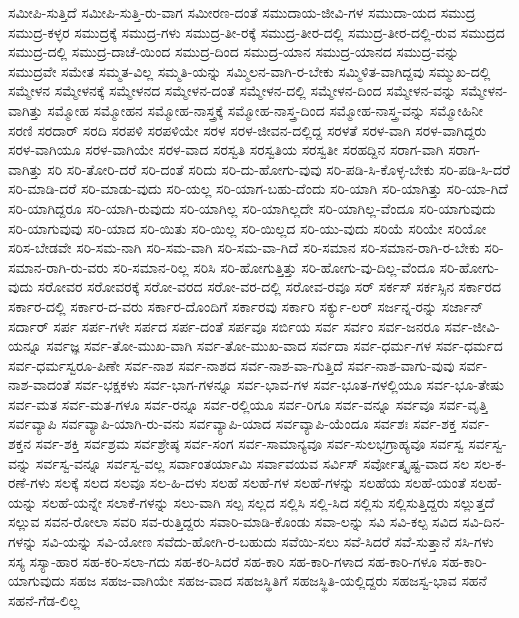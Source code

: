 {ಸಮೀಪಿ-ಸುತ್ತಿದೆ
ಸಮೀಪಿ-ಸುತ್ತಿ-ರು-ವಾಗ
ಸಮೀರಣ-ದಂತೆ
ಸಮುದಾಯ-ಜೀವಿ-ಗಳ
ಸಮುದಾ-ಯದ
ಸಮುದ್ರ
ಸಮುದ್ರ-ಕಳ್ಳರ
ಸಮುದ್ರಕ್ಕೆ
ಸಮುದ್ರ-ಗಳು
ಸಮುದ್ರ-ತೀ-ರಕ್ಕೆ
ಸಮುದ್ರ-ತೀರ-ದಲ್ಲಿ
ಸಮುದ್ರ-ತೀರ-ದಲ್ಲಿ-ರುವ
ಸಮುದ್ರದ
ಸಮುದ್ರ-ದಲ್ಲಿ
ಸಮುದ್ರ-ದಾಚೆ-ಯಿಂದ
ಸಮುದ್ರ-ದಿಂದ
ಸಮುದ್ರ-ಯಾನ
ಸಮುದ್ರ-ಯಾನದ
ಸಮುದ್ರ-ವನ್ನು
ಸಮುದ್ರವೇ
ಸಮೇತ
ಸಮ್ಮತ-ವಿಲ್ಲ
ಸಮ್ಮತಿ-ಯನ್ನು
ಸಮ್ಮಿಲನ-ವಾಗಿ-ರ-ಬೇಕು
ಸಮ್ಮಿಳಿತ-ವಾಗಿದ್ದವು
ಸಮ್ಮುಖ-ದಲ್ಲಿ
ಸಮ್ಮೇಳನ
ಸಮ್ಮೇಳನಕ್ಕೆ
ಸಮ್ಮೇಳನದ
ಸಮ್ಮೇಳನ-ದಂತೆ
ಸಮ್ಮೇಳನ-ದಲ್ಲಿ
ಸಮ್ಮೇಳನ-ದಿಂದ
ಸಮ್ಮೇಳನ-ವನ್ನು
ಸಮ್ಮೇಳನ-ವಾಗಿತ್ತು
ಸಮ್ಮೋಹ
ಸಮ್ಮೋಹನ
ಸಮ್ಮೋಹ-ನಾಸ್ತ್ರಕ್ಕೆ
ಸಮ್ಮೋಹ-ನಾಸ್ತ್ರ-ದಿಂದ
ಸಮ್ಮೋಹ-ನಾಸ್ತ್ರ-ವನ್ನು
ಸಮ್ಮೋಹಿನೀ
ಸರಣಿ
ಸರದಾರ್
ಸರದಿ
ಸರಪಳಿ
ಸರಪಳಿಯೇ
ಸರಳ
ಸರಳ-ಜೀವನ-ದಲ್ಲಿದ್ದ
ಸರಳತೆ
ಸರಳ-ವಾಗಿ
ಸರಳ-ವಾಗಿದ್ದರು
ಸರಳ-ವಾಗಿಯೂ
ಸರಳ-ವಾಗಿಯೇ
ಸರಳ-ವಾದ
ಸರಸ್ವತಿ
ಸರಸ್ವತಿಯ
ಸರಸ್ವತೀ
ಸರಹದ್ದಿನ
ಸರಾಗ-ವಾಗಿ
ಸರಾಗ-ವಾಗಿತ್ತು
ಸರಿ
ಸರಿ-ತೋರಿ-ದರೆ
ಸರಿ-ದಂತೆ
ಸರಿದು
ಸರಿ-ದು-ಹೋಗು-ವುವು
ಸರಿ-ಪಡಿ-ಸಿ-ಕೊಳ್ಳ-ಬೇಕು
ಸರಿ-ಪಡಿ-ಸಿ-ದರೆ
ಸರಿ-ಮಾಡಿ-ದರೆ
ಸರಿ-ಮಾಡು-ವುದು
ಸರಿ-ಯಲ್ಲ
ಸರಿ-ಯಾಗ-ಬಹು-ದೆಂದು
ಸರಿ-ಯಾಗಿ
ಸರಿ-ಯಾಗಿತ್ತು
ಸರಿ-ಯಾ-ಗಿದೆ
ಸರಿ-ಯಾಗಿದ್ದರೂ
ಸರಿ-ಯಾಗಿ-ರುವುದು
ಸರಿ-ಯಾಗಿಲ್ಲ
ಸರಿ-ಯಾಗಿಲ್ಲದೇ
ಸರಿ-ಯಾಗಿಲ್ಲ-ವೆಂದೂ
ಸರಿ-ಯಾಗುವುದು
ಸರಿ-ಯಾಗುವುವು
ಸರಿ-ಯಾದ
ಸರಿ-ಯಿತು
ಸರಿ-ಯಿಲ್ಲ
ಸರಿ-ಯಿಲ್ಲದ
ಸರಿ-ಯು-ವುದು
ಸರಿಯೆ
ಸರಿಯೇ
ಸರಿಯೋ
ಸರಿಸ-ಬೇಡವೇ
ಸರಿ-ಸಮ-ನಾಗಿ
ಸರಿ-ಸಮ-ವಾಗಿ
ಸರಿ-ಸಮ-ವಾ-ಗಿದೆ
ಸರಿ-ಸಮಾನ
ಸರಿ-ಸಮಾನ-ರಾಗಿ-ರ-ಬೇಕು
ಸರಿ-ಸಮಾನ-ರಾಗಿ-ರು-ವರು
ಸರಿ-ಸಮಾನ-ರಿಲ್ಲ
ಸರಿಸಿ
ಸರಿ-ಹೋಗುತ್ತಿತ್ತು
ಸರಿ-ಹೋಗು-ವು-ದಿಲ್ಲ-ವೆಂದೂ
ಸರಿ-ಹೋಗು-ವುದು
ಸರೋವರ
ಸರೋವರಕ್ಕೆ
ಸರೋ-ವರದ
ಸರೋ-ವರ-ದಲ್ಲಿ
ಸರೋವ-ರವೂ
ಸರ್
ಸರ್ಕಸ್
ಸರ್ಕಸ್ಸಿನ
ಸರ್ಕಾರದ
ಸರ್ಕಾರ-ದಲ್ಲಿ
ಸರ್ಕಾರ-ದ-ವರು
ಸರ್ಕಾರ-ದೊಂದಿಗೆ
ಸರ್ಕಾರವು
ಸರ್ಕಾರಿ
ಸರ್ಕ್ಯು-ಲರ್
ಸರ್ಜನ್ನ-ರನ್ನು
ಸರ್ಜಾನ್
ಸರ್ದಾರ್
ಸರ್ಪ
ಸರ್ಪ-ಗಳೇ
ಸರ್ಪದ
ಸರ್ಪ-ದಂತೆ
ಸರ್ಪವೂ
ಸರ್ಬಿಯ
ಸರ್ವ
ಸರ್ವಂ
ಸರ್ವ-ಜನರೂ
ಸರ್ವ-ಜೀವಿ-ಯನ್ನೂ
ಸರ್ವಜ್ಞ
ಸರ್ವ-ತೋ-ಮುಖ-ವಾಗಿ
ಸರ್ವ-ತೋ-ಮುಖ-ವಾದ
ಸರ್ವದಾ
ಸರ್ವ-ಧರ್ಮ-ಗಳ
ಸರ್ವ-ಧರ್ಮದ
ಸರ್ವ-ಧರ್ಮಸ್ವರೂ-ಪಿಣೇ
ಸರ್ವ-ನಾಶ
ಸರ್ವ-ನಾಶದ
ಸರ್ವ-ನಾಶ-ವಾ-ಗುತ್ತಿದೆ
ಸರ್ವ-ನಾಶ-ವಾಗು-ವುವು
ಸರ್ವ-ನಾಶ-ವಾದಂತೆ
ಸರ್ವ-ಭಕ್ಷಕಳು
ಸರ್ವ-ಭಾಗ-ಗಳನ್ನೂ
ಸರ್ವ-ಭಾವ-ಗಳ
ಸರ್ವ-ಭೂತ-ಗಳಲ್ಲಿಯೂ
ಸರ್ವ-ಭೂ-ತೇಷು
ಸರ್ವ-ಮತ
ಸರ್ವ-ಮತ-ಗಳೂ
ಸರ್ವ-ರನ್ನೂ
ಸರ್ವ-ರಲ್ಲಿಯೂ
ಸರ್ವ-ರಿಗೂ
ಸರ್ವ-ವನ್ನೂ
ಸರ್ವವೂ
ಸರ್ವ-ವೃತ್ತಿ
ಸರ್ವವ್ಯಾಪಿ
ಸರ್ವವ್ಯಾಪಿ-ಯಾಗಿ-ರು-ವನು
ಸರ್ವವ್ಯಾಪಿ-ಯಾದ
ಸರ್ವವ್ಯಾಪಿ-ಯೆಂದೂ
ಸರ್ವಶಃ
ಸರ್ವ-ಶಕ್ತ
ಸರ್ವ-ಶಕ್ತನ
ಸರ್ವ-ಶಕ್ತಿ
ಸರ್ವಶ್ರಮ
ಸರ್ವಶ್ರೇಷ್ಠ
ಸರ್ವ-ಸಂಗ
ಸರ್ವ-ಸಾಮಾನ್ಯವೂ
ಸರ್ವ-ಸುಲಭಗ್ರಾಹ್ಯವೂ
ಸರ್ವಸ್ವ
ಸರ್ವಸ್ವ-ವನ್ನು
ಸರ್ವಸ್ವ-ವನ್ನೂ
ಸರ್ವಸ್ವ-ವಲ್ಲ
ಸರ್ವಾಂತರ್ಯಾಮಿ
ಸರ್ವಾವಯವ
ಸರ್ವಿಸ್
ಸರ್ವೋತ್ಕೃಷ್ಟ-ವಾದ
ಸಲ
ಸಲ-ಕ-ರಣೆ-ಗಳು
ಸಲಕ್ಕೆ
ಸಲದ
ಸಲವೂ
ಸಲ-ಹಿ-ದಳು
ಸಲಹೆ
ಸಲಹೆ-ಗಳ
ಸಲಹೆ-ಗಳನ್ನು
ಸಲಹೆಯ
ಸಲಹೆ-ಯಂತೆ
ಸಲಹೆ-ಯನ್ನು
ಸಲಹೆ-ಯನ್ನೇ
ಸಲಾಕೆ-ಗಳನ್ನು
ಸಲು-ವಾಗಿ
ಸಲ್ಪ
ಸಲ್ಲದ
ಸಲ್ಲಿಸಿ
ಸಲ್ಲಿ-ಸಿದ
ಸಲ್ಲಿಸು
ಸಲ್ಲಿಸುತ್ತಿದ್ದರು
ಸಲ್ಲುತ್ತದೆ
ಸಲ್ಲುವ
ಸವನ-ರೋಲಾ
ಸವರಿ
ಸವ-ರುತ್ತಿದ್ದರು
ಸವಾರಿ-ಮಾಡಿ-ಕೊಂಡು
ಸವಾ-ಲನ್ನು
ಸವಿ
ಸವಿ-ಕಲ್ಪ
ಸವಿದ
ಸವಿ-ದಿನ-ಗಳನ್ನು
ಸವಿ-ಯನ್ನು
ಸವಿ-ಯೋಣ
ಸವೆದು-ಹೋಗಿ-ರ-ಬಹುದು
ಸವೆಯಿ-ಸಲು
ಸವೆ-ಸಿದರೆ
ಸವೆ-ಸುತ್ತಾನೆ
ಸಸಿ-ಗಳು
ಸಸ್ಯ
ಸಸ್ಯಾ-ಹಾರ
ಸಹ-ಕರಿ-ಸಲಾ-ಗದು
ಸಹ-ಕರಿ-ಸಿದರೆ
ಸಹ-ಕಾರಿ
ಸಹ-ಕಾರಿ-ಗಳಾದ
ಸಹ-ಕಾರಿ-ಗಳೂ
ಸಹ-ಕಾರಿ-ಯಾಗುವುದು
ಸಹಜ
ಸಹಜ-ವಾಗಿಯೇ
ಸಹಜ-ವಾದ
ಸಹಜಸ್ಥಿತಿಗೆ
ಸಹಜಸ್ಥಿತಿ-ಯಲ್ಲಿದ್ದರು
ಸಹಜಸ್ವ-ಭಾವ
ಸಹನೆ
ಸಹನೆ-ಗೆಡ-ಲಿಲ್ಲ
}
